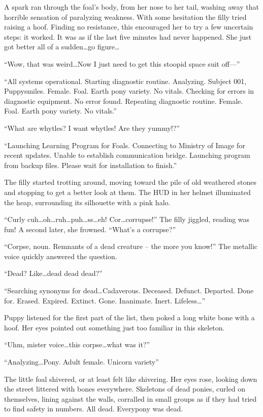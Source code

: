 A spark ran through the foal's body, from her nose to her tail, washing away that horrible sensation of paralyzing weakness. With some hesitation the filly tried raising a hoof. Finding no resistance, this encouraged her to try a few uncertain steps: it worked. It was as if the last five minutes had never happened. She just got better all of a sudden\dots go figure\dots

``Wow, that was weird\dots Now I just need to get this stoopid space suit off---''

``{\mt All systems operational. Starting diagnostic routine. Analyzing. Subject 001, Puppysmiles. Female. Foal. Earth pony variety. No vitals. Checking for errors in diagnostic equipment. No error found. Repeating diagnostic routine. Female. Foal. Earth pony variety. No vitals.}''

``What are whytles? I want whytles! Are they yummy!?''

``{\mt Launching Learning Program for Foals. Connecting to Ministry of Image for recent updates. Unable to establish communication bridge. Launching program from backup files. Please wait for installation to finish.}''

The filly started trotting around, moving toward the pile of old weathered stones and stopping to get a better look at them. The HUD in her helmet illuminated the heap, surrounding its silhouette with a pink halo.

``Curly cuh\dots oh\dots ruh\dots puh\dots ss\dots eh! Cor\dots corrupse!'' The filly jiggled, reading was fun! A second later, she frowned. ``What's a corrupse?''

``{\mt Corpse, noun. Remnants of a dead creature -- the more you know!}'' The metallic voice quickly answered the question.

``{\mt Dead? Like\dots dead dead dead?}''

``{\mt Searching synonyms for dead\dots Cadaverous. Deceased. Defunct. Departed. Done for. Erased. Expired. Extinct. Gone. Inanimate. Inert. Lifeless\dots}''

Puppy listened for the first part of the list, then poked a long white bone with a hoof. Her eyes pointed out something just too familiar in this skeleton.

``Uhm, mister voice\dots this corpse\dots what was it?''

``{\mt Analyzing\dots Pony. Adult female. Unicorn variety}''

The little foal shivered, or at least felt like shivering. Her eyes rose, looking down the street littered with bones everywhere. Skeletons of dead ponies, curled on themselves, lining against the walls, corralled in small groups as if they had tried to find safety in numbers. All dead. Everypony was dead.

